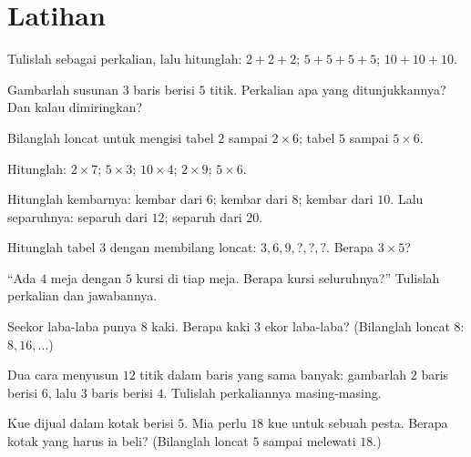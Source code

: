 \section{Latihan}

\begin{exercise}[$\star$]\label{exo:g2:mult:1}
Tulislah sebagai perkalian, lalu hitunglah: $2 + 2 + 2$; \quad
$5 + 5 + 5 + 5$; \quad $10 + 10 + 10$.
\end{exercise}

\begin{exercise}[$\star$]\label{exo:g2:mult:2}
Gambarlah susunan $3$ baris berisi $5$ titik. Perkalian apa yang
ditunjukkannya? Dan kalau dimiringkan?
\end{exercise}

\begin{exercise}[$\star$]\label{exo:g2:mult:3}
Bilanglah loncat untuk mengisi tabel $2$ sampai $2 \times 6$; tabel
$5$ sampai $5 \times 6$.
\end{exercise}

\begin{exercise}[$\star$]\label{exo:g2:mult:4}
Hitunglah: $2 \times 7$; \quad $5 \times 3$; \quad $10 \times 4$;
\quad $2 \times 9$; \quad $5 \times 6$.
\end{exercise}

\begin{exercise}[$\star$]\label{exo:g2:mult:5}
Hitunglah kembarnya: kembar dari $6$; kembar dari $8$; kembar dari
$10$. Lalu separuhnya: separuh dari $12$; separuh dari $20$.
\end{exercise}

\begin{exercise}[$\star$]\label{exo:g2:mult:6}
Hitunglah tabel $3$ dengan membilang loncat: $3, 6, 9, ?, ?, ?$.
Berapa $3 \times 5$?
\end{exercise}

\begin{exercise}[$\star$]\label{exo:g2:mult:7}
``Ada $4$ meja dengan $5$ kursi di tiap meja. Berapa kursi
seluruhnya?'' Tulislah perkalian dan jawabannya.
\end{exercise}

\begin{exercise}[$\star$]\label{exo:g2:mult:8}
Seekor laba-laba punya $8$ kaki. Berapa kaki $3$ ekor laba-laba?
(Bilanglah loncat $8$: $8, 16, \dots$)
\end{exercise}

\begin{exercise}[$\star$]\label{exo:g2:mult:9}
Dua cara menyusun $12$ titik dalam baris yang sama banyak: gambarlah
$2$ baris berisi $6$, lalu $3$ baris berisi $4$. Tulislah perkaliannya masing-masing.
\end{exercise}

\begin{exercise}[$\star\star$]\label{exo:g2:mult:10}
Kue dijual dalam kotak berisi $5$. Mia perlu $18$ kue untuk sebuah
pesta. Berapa kotak yang harus ia beli? (Bilanglah loncat $5$ sampai melewati $18$.)

\end{exercise}

